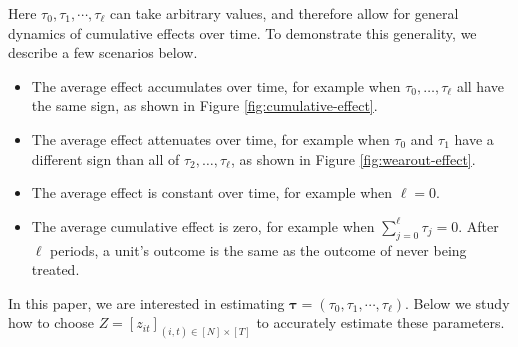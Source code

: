 Here $\tau_0, \tau_1, \cdots, \tau_\ell$ can take arbitrary values, and therefore allow for general dynamics of cumulative effects over time. To demonstrate this generality, we describe a few scenarios below.
	\begin{itemize}
	    \item The average effect accumulates over time, for example when $\tau_0,\ldots,\tau_\ell$ all have the same sign, as shown in Figure \ref{fig:cumulative-effect}.
	    
	    \item The average effect attenuates over time, for example when $\tau_0$ and $\tau_1$ have a different sign than all of $\tau_2,\ldots,\tau_\ell$, as shown in Figure \ref{fig:wearout-effect}.
	    
	    \item The average effect is constant over time, for example when $\ell = 0$.
	    
	    \item The average cumulative effect is zero, for example when $\sum_{j=0}^\ell \tau_j=0$. After $\ell$ periods, a unit's outcome is the same as the outcome of never being treated. 
	    
	\end{itemize}
	
		In this paper, we are interested in estimating $\bm{\tau} = (\tau_0, \tau_1, \cdots, \tau_\ell)$. Below we study how to choose $Z = [z_{it}]_{(i,t)\in [N]\times[T]}$
		to accurately estimate these parameters.